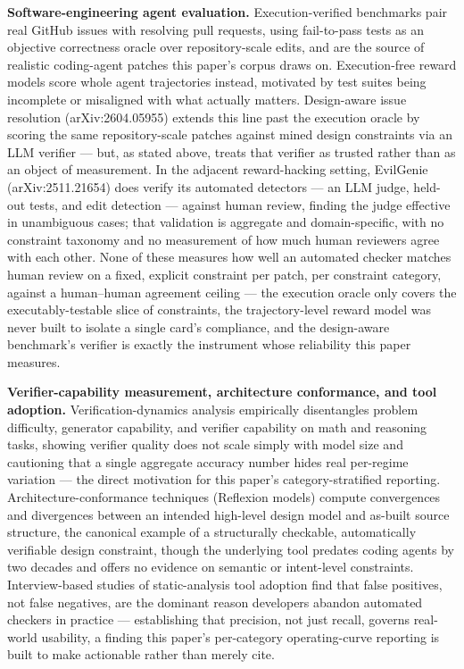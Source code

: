\documentclass[11pt]{article}
\begin{document}
\textbf{Software-engineering agent evaluation.} Execution-verified benchmarks pair real GitHub issues with resolving pull requests, using fail-to-pass tests as an objective correctness oracle over repository-scale edits, and are the source of realistic coding-agent patches this paper's corpus draws on. Execution-free reward models score whole agent trajectories instead, motivated by test suites being incomplete or misaligned with what actually matters. Design-aware issue resolution (arXiv:2604.05955) extends this line past the execution oracle by scoring the same repository-scale patches against mined design constraints via an LLM verifier --- but, as stated above, treats that verifier as trusted rather than as an object of measurement. In the adjacent reward-hacking setting, EvilGenie (arXiv:2511.21654) does verify its automated detectors --- an LLM judge, held-out tests, and edit detection --- against human review, finding the judge effective in unambiguous cases; that validation is aggregate and domain-specific, with no constraint taxonomy and no measurement of how much human reviewers agree with each other. None of these measures how well an automated checker matches human review on a fixed, explicit constraint per patch, per constraint category, against a human--human agreement ceiling --- the execution oracle only covers the executably-testable slice of constraints, the trajectory-level reward model was never built to isolate a single card's compliance, and the design-aware benchmark's verifier is exactly the instrument whose reliability this paper measures.

\textbf{Verifier-capability measurement, architecture conformance, and tool adoption.} Verification-dynamics analysis empirically disentangles problem difficulty, generator capability, and verifier capability on math and reasoning tasks, showing verifier quality does not scale simply with model size and cautioning that a single aggregate accuracy number hides real per-regime variation --- the direct motivation for this paper's category-stratified reporting. Architecture-conformance techniques (Reflexion models) compute convergences and divergences between an intended high-level design model and as-built source structure, the canonical example of a structurally checkable, automatically verifiable design constraint, though the underlying tool predates coding agents by two decades and offers no evidence on semantic or intent-level constraints. Interview-based studies of static-analysis tool adoption find that false positives, not false negatives, are the dominant reason developers abandon automated checkers in practice --- establishing that precision, not just recall, governs real-world usability, a finding this paper's per-category operating-curve reporting is built to make actionable rather than merely cite.
\end{document}
